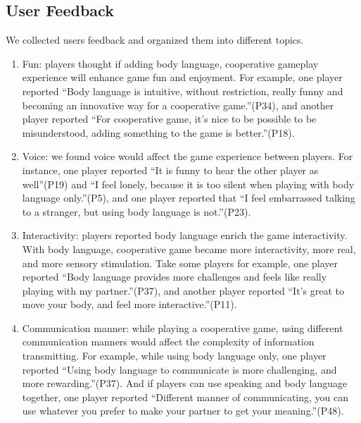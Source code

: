\subsection{User Feedback}
	We collected users feedback and organized them into different topics.
\begin{enumerate}
  \item Fun:  players thought if adding body language, cooperative gameplay experience will enhance game fun and enjoyment. For example, one player reported ``Body language is intuitive, without restriction, really funny and becoming an innovative way for a cooperative game.''(P34), and another player reported
	``For cooperative game, it's nice to be possible to be misunderstood, adding something to the game is better.''(P18).



  \item Voice: we found voice would affect the game experience between players. For instance, one player reported ``It is funny to hear the other player as well''(P19) and ``I feel lonely, because it is too silent when playing with body language only.''(P5), and one player reported that ``I feel embarrassed talking to a stranger, but using body language is not.''(P23).


  \item Interactivity: players reported body language enrich the game interactivity. With body language, cooperative game became more interactivity, more real, and more sensory stimulation. Take some players for example, one player reported ``Body language provides more challenges and feels like really playing with my partner.''(P37), and another player reported ``It's great to move your body, and feel more interactive.''(P11). 



  \item Communication manner: while playing a cooperative game, using different communication manners would affect the complexity of information transmitting. For example, while using body language only, one player reported ``Using body language to communicate is more challenging, and more rewarding.''(P37). And if players can use speaking and body language together, one player reported ``Different manner of communicating, you can use whatever you prefer to make your partner to get your meaning.''(P48). 



\end{enumerate}

